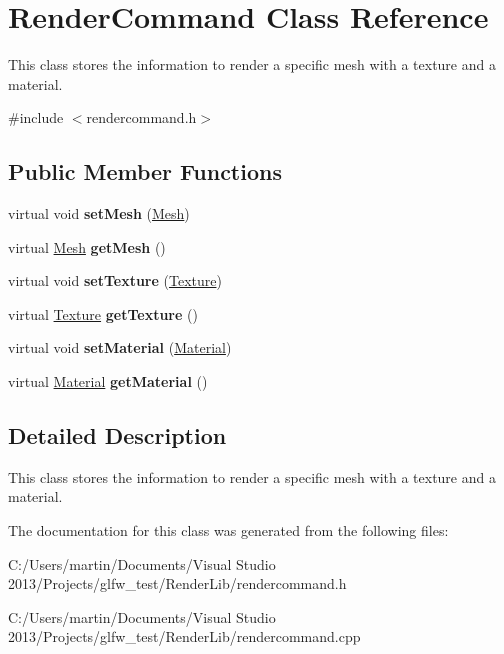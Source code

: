 \hypertarget{class_render_command}{}\section{Render\+Command Class Reference}
\label{class_render_command}


This class stores the information to render a specific mesh with a texture and a material.  




{\ttfamily \#include $<$rendercommand.\+h$>$}

\subsection*{Public Member Functions}
\begin{DoxyCompactItemize}
\item 
\mbox{\label{class_render_command_a98f905b6821b7754be419c65d4149487}} 
virtual void {\bfseries set\+Mesh} (\hyperlink{class_mesh}{Mesh})
\item 
\mbox{\label{class_render_command_a271e13303ed5c99b607ca3e2e9cbb98d}} 
virtual \hyperlink{class_mesh}{Mesh} {\bfseries get\+Mesh} ()
\item 
\mbox{\label{class_render_command_a9295902c73a05fde8a4ef7bf92de2a3a}} 
virtual void {\bfseries set\+Texture} (\hyperlink{class_texture}{Texture})
\item 
\mbox{\label{class_render_command_ade766589e33b679c3df720740ff2ea43}} 
virtual \hyperlink{class_texture}{Texture} {\bfseries get\+Texture} ()
\item 
\mbox{\label{class_render_command_aa4d9cd85d312f3f801224e4928c06d87}} 
virtual void {\bfseries set\+Material} (\hyperlink{class_material}{Material})
\item 
\mbox{\label{class_render_command_a6ac5e232e6395f2b2212f99631918fa7}} 
virtual \hyperlink{class_material}{Material} {\bfseries get\+Material} ()
\end{DoxyCompactItemize}


\subsection{Detailed Description}
This class stores the information to render a specific mesh with a texture and a material. 

The documentation for this class was generated from the following files\+:\begin{DoxyCompactItemize}
\item 
C\+:/\+Users/martin/\+Documents/\+Visual Studio 2013/\+Projects/glfw\+\_\+test/\+Render\+Lib/rendercommand.\+h\item 
C\+:/\+Users/martin/\+Documents/\+Visual Studio 2013/\+Projects/glfw\+\_\+test/\+Render\+Lib/rendercommand.\+cpp\end{DoxyCompactItemize}
